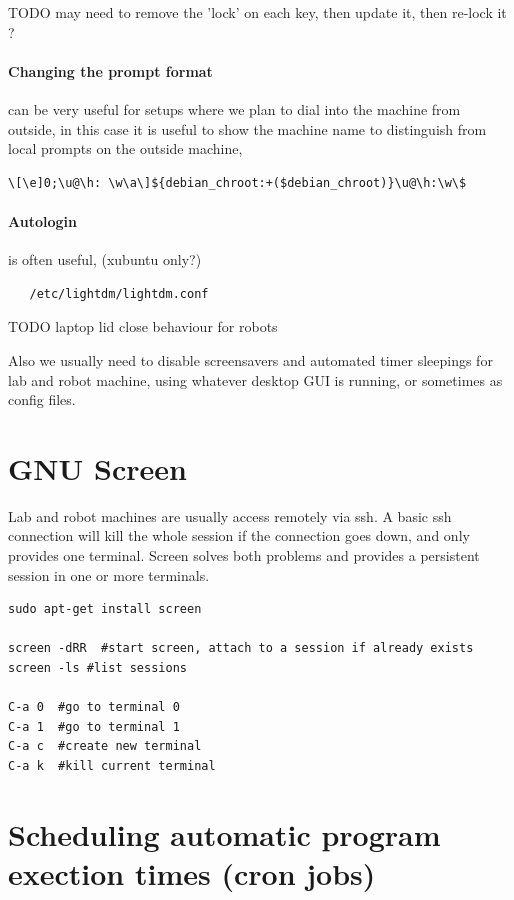 \documentclass[oneside,english]{scrbook}
\begin{document}
TODO may need to remove the 'lock' on each key, then update it, then re-lock it ?

\paragraph{Changing the prompt format} can be very useful for setups where we plan to dial into the machine from outside, in this case it is useful to show the machine name to distinguish from local prompts on the outside machine,
\begin{lstlisting}
\[\e]0;\u@\h: \w\a\]${debian_chroot:+($debian_chroot)}\u@\h:\w\$
\end{lstlisting}

\paragraph{Autologin} is often useful, (xubuntu only?)
\begin{lstlisting}
   /etc/lightdm/lightdm.conf
\end{lstlisting}

TODO laptop lid close behaviour for robots

Also we usually need to disable screensavers and automated timer sleepings for lab and robot machine, using whatever desktop GUI is running, or sometimes as config files.

\section{GNU Screen}
Lab and robot machines are usually access remotely via ssh.  A basic ssh connection will kill the whole session if the connection goes down, and only provides one terminal.   Screen solves both problems and provides a persistent session in one or more terminals.

\begin{lstlisting}
sudo apt-get install screen

screen -dRR  #start screen, attach to a session if already exists
screen -ls #list sessions

C-a 0  #go to terminal 0
C-a 1  #go to terminal 1
C-a c  #create new terminal
C-a k  #kill current terminal
\end{lstlisting}

\section{Scheduling automatic program exection times (cron jobs)}
\end{document}
